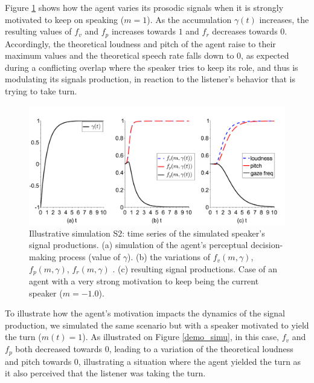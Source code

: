 Figure \ref{demo_simu_l1} shows how the agent varies its prosodic signals when it is strongly motivated to keep on speaking ($m=1$).
As the accumulation $\gamma(t)$ increases, the resulting values of $f_v$ and $f_p$ increases towards $1$ and $f_r$ decreases towards $0$. 
Accordingly, the theoretical loudness and pitch of the agent raise to their maximum values and the theoretical speech rate falls down to $0$, as expected during a conflicting overlap where the speaker tries to keep its role, and thus is modulating its signals production,  in reaction to the listener's behavior that is trying to take turn. 


\begin{figure}
  \centering
  \includegraphics[width=\linewidth]{figure/signals_simu_s2a.pdf}
  \caption{Illustrative simulation S2: time series of the simulated speaker's signal productions. (a) simulation of the agent's perceptual decision-making process (value of $\gamma$). (b) the variations of $f_v(m,\gamma)$, $f_p(m,\gamma)$, $f_r(m,\gamma)$ . (c) resulting  signal productions. Case of an agent with a very strong motivation to keep being the current speaker ($m=-1.0$).}
  \label{demo_simu_l1}
\end{figure}

To illustrate how the agent's motivation impacts the dynamics of the signal production, we simulated the same scenario but with a speaker motivated to yield the turn ($m(t)=1$). As illustrated on Figure \ref{demo_simu}, in this case, $f_v$ and $f_p$ both decreased towards $0$, leading to a variation of the theoretical loudness and pitch towards $0$, illustrating a situation where the agent yielded the turn as it also perceived that the listener was taking the turn. 

